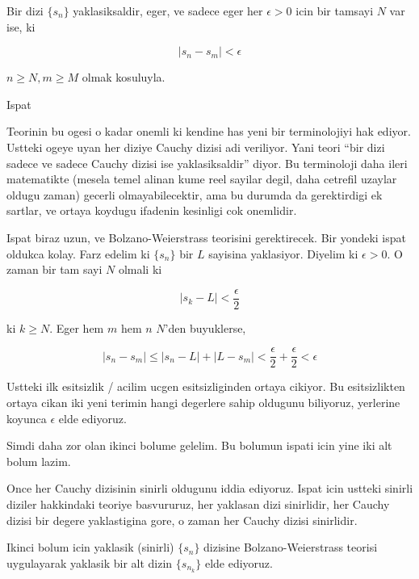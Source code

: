 \documentclass[12pt,fleqn]{article}
\begin{document}
Bir dizi $\{s_n\}$ yaklasiksaldir, eger, ve sadece eger her $\epsilon > 0$
icin bir tamsayi $N$ var ise, ki 

\[ |s_n - s_m| < \epsilon \]

$n \ge N, m \ge M$ olmak kosuluyla. 

Ispat

Teorinin bu ogesi o kadar onemli ki kendine has yeni bir terminolojiyi hak
ediyor. Ustteki ogeye uyan her diziye Cauchy dizisi adi veriliyor. Yani
teori ``bir dizi sadece ve sadece Cauchy dizisi ise yaklasiksaldir''
diyor. Bu terminoloji daha ileri matematikte (mesela temel alinan kume reel
sayilar degil, daha cetrefil uzaylar oldugu zaman) gecerli
olmayabilecektir, ama bu durumda da gerektirdigi ek sartlar, ve ortaya
koydugu ifadenin kesinligi cok onemlidir.

Ispat biraz uzun, ve Bolzano-Weierstrass teorisini gerektirecek. Bir
yondeki ispat oldukca kolay. Farz edelim ki $\{s_n\}$ bir $L$ sayisina
yaklasiyor. Diyelim ki $\epsilon > 0$. O zaman bir tam sayi $N$ olmali ki 

\[ |s_k - L| < \frac{\epsilon}{2} \]

ki $k \ge N$. Eger hem $m$ hem $n$ $N$'den buyuklerse, 

\[ |s_n - s_m| \le |s_n - L| + |L - s_m| < 
\frac{\epsilon}{2} + \frac{\epsilon}{2} <
\epsilon
\]

Ustteki ilk esitsizlik / acilim ucgen esitsizliginden ortaya cikiyor. Bu
esitsizlikten ortaya cikan iki yeni terimin hangi degerlere sahip oldugunu
biliyoruz, yerlerine koyunca $\epsilon$ elde ediyoruz. 

Simdi daha zor olan ikinci bolume gelelim. Bu bolumun ispati icin yine iki
alt bolum lazim. 

Once her Cauchy dizisinin sinirli oldugunu iddia ediyoruz. Ispat icin
ustteki sinirli diziler hakkindaki teoriye basvururuz, her yaklasan dizi
sinirlidir, her Cauchy dizisi bir degere yaklastigina gore, o zaman her
Cauchy dizisi sinirlidir.

Ikinci bolum icin yaklasik (sinirli) $\{s_n\}$ dizisine Bolzano-Weierstrass
teorisi uygulayarak yaklasik bir alt dizin $\{s_{n_k}\}$ elde ediyoruz. 
\end{document}
